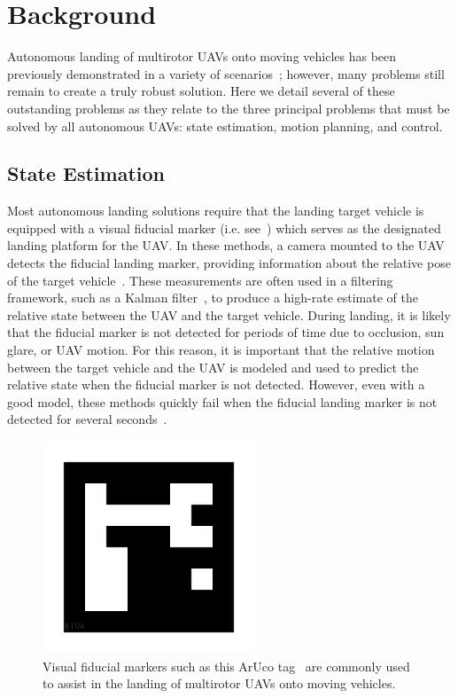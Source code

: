 \section{Background}

Autonomous landing of multirotor UAVs onto moving vehicles has been previously
demonstrated in a variety of scenarios~\cite{wynn2019visual}; however, many problems still remain to
create a truly robust solution. Here we detail several of these outstanding
problems as they relate to the three principal problems that must be solved by
all autonomous UAVs: state estimation, motion planning, and control.

\subsection{State Estimation}
Most autonomous landing solutions require that the landing target vehicle is equipped
with a visual fiducial marker (i.e. see~)
which serves as
the designated landing platform for the UAV.
In these methods, a camera mounted to the UAV detects the fiducial landing marker, providing
information about the relative pose of the target
vehicle~\cite{borowczyk2017autonomous}. These measurements are often used in a
filtering framework, such as a Kalman filter~\cite{kalman}, to produce a
high-rate estimate of the relative state between the UAV and the target
vehicle. During landing, it is likely
that the fiducial marker is not detected for periods of time due to occlusion,
sun glare, or UAV motion. For this reason, it is important that the relative
motion between the target vehicle and the UAV is modeled and used to predict
the relative state when the fiducial marker is not detected.
However, even with a good model,
these methods quickly fail when the fiducial landing
marker is not detected for several seconds~\cite{ling2014precision}.

\begin{figure}[h]
  \centering
  \includegraphics[width=2.5in]{figures/aruco_104.png}
  \caption[Visual Fiducial Marker]{Visual fiducial markers such as this
    ArUco tag~\cite{garrido2016generation} are commonly used to assist in the
  landing of multirotor UAVs onto moving vehicles.}
  \label{fig:aruco_tag}
\end{figure}

